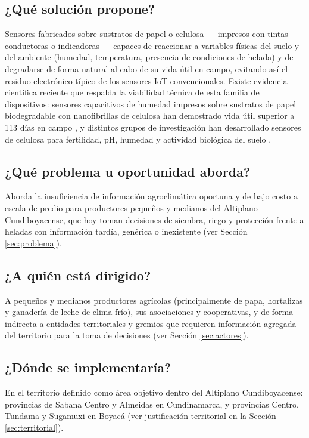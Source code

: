 \documentclass[11pt,a4paper]{article}
\begin{document}
\subsection{¿Qué solución propone?}
Sensores fabricados sobre sustratos de papel o celulosa --- impresos con tintas conductoras o indicadoras --- capaces de reaccionar a variables físicas del suelo y del ambiente (humedad, temperatura, presencia de condiciones de helada) y de degradarse de forma natural al cabo de su vida útil en campo, evitando así el residuo electrónico típico de los sensores IoT convencionales. Existe evidencia científica reciente que respalda la viabilidad técnica de esta familia de dispositivos: sensores capacitivos de humedad impresos sobre sustratos de papel biodegradable con nanofibrillas de celulosa han demostrado vida útil superior a 113 días en campo \citep{sciencedirect2025paper}, y distintos grupos de investigación han desarrollado sensores de celulosa para fertilidad, pH, humedad y actividad biológica del suelo \citep{nature2026cellulose,ieee2023biodeg,sciencedirect2024review,tudelft_sf,osaka_sf}.

\subsection{¿Qué problema u oportunidad aborda?}
Aborda la insuficiencia de información agroclimática oportuna y de bajo costo a escala de predio para productores pequeños y medianos del Altiplano Cundiboyacense, que hoy toman decisiones de siembra, riego y protección frente a heladas con información tardía, genérica o inexistente (ver Sección \ref{sec:problema}).

\subsection{¿A quién está dirigido?}
A pequeños y medianos productores agrícolas (principalmente de papa, hortalizas y ganadería de leche de clima frío), sus asociaciones y cooperativas, y de forma indirecta a entidades territoriales y gremios que requieren información agregada del territorio para la toma de decisiones (ver Sección \ref{sec:actores}).

\subsection{¿Dónde se implementaría?}
En el territorio definido como área objetivo dentro del Altiplano Cundiboyacense: provincias de Sabana Centro y Almeidas en Cundinamarca, y provincias Centro, Tundama y Sugamuxi en Boyacá (ver justificación territorial en la Sección \ref{sec:territorial}).
\end{document}

